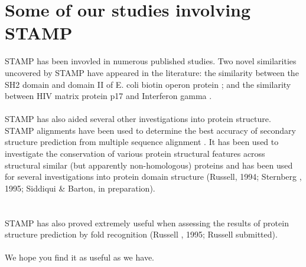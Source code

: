 \chapter{Some of our studies involving STAMP}

STAMP has been invovled in numerous published studies.  
Two novel similarities uncovered by STAMP have appeared 
in the literature: the similarity between the SH2 domain 
and domain II of E. coli biotin operon protein \cite{rb93b}; and the 
similarity between HIV matrix protein p17 and Interferon 
gamma \cite{matthews94}.\\
\\
STAMP has also aided several other investigations 
into protein structure.  STAMP alignments have been used to 
determine the best accuracy of secondary structure prediction 
from multiple sequence alignment \cite{rb93c}. It has been used to 
investigate the conservation of various protein structural features 
across  structural similar (but apparently non-homologous) proteins 
\cite{rb94} and has been used for several investigations into protein domain 
structure (Russell, 1994; Sternberg \ea, 1995; Siddiqui \& Barton, in preparation).\\
\nocite{russell94,sternberg95}\\
\\
STAMP has also proved extremely useful when assessing the results of
protein structure prediction by fold recognition (Russell \ea, 1995; Russell \ea submitted).\\
\nocite{rcb95a}
\\
We hope you find it as useful as we have.





